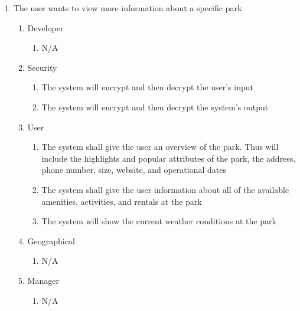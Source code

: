 \documentclass[titlepage]{article}
\begin{document}
\begin{enumerate}[{BE}1.]
    \item The user wants to view more information about a specific park
    \begin{enumerate}[{VP\theenumi}.1]
        \item Developer
            \begin{enumerate}
                \item N/A
            \end{enumerate}
        \item Security
            \begin{enumerate}
                \item The system will encrypt and then decrypt the user's input
                \item The system will encrypt and then decrypt the system's output
            \end{enumerate}
        \item User
            \begin{enumerate}
                \item The system shall give the user an overview of the park. Thus will include the
                highlights and popular attributes of the park, the address, phone number, size,
                website, and operational dates
                \item The system shall give the user information about all of the available
                amenities, activities, and rentals at the park
                \item The system will show the current weather conditions at the park
            \end{enumerate}
        \item Geographical
            \begin{enumerate}
                \item N/A
            \end{enumerate}
        \item Manager
            \begin{enumerate}
                \item N/A
            \end{enumerate}
    \end{enumerate}


\end{enumerate}
\end{document}
